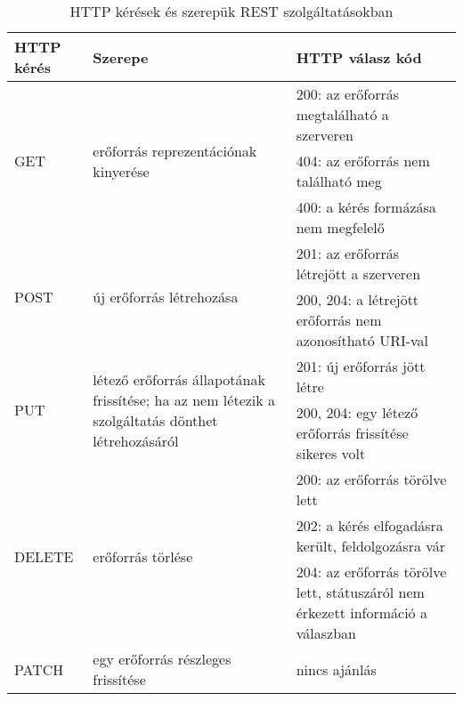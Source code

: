 	\begin{longtable}{| p{.20\linewidth} | p{.50\linewidth} | p{.30\linewidth } |}		
					\caption{HTTP kérések és szerepük REST szolgáltatásokban}
		\label{tab:restAndHttp} \\
		\hline
		HTTP kérés & Szerepe & HTTP válasz kód \\
		\hline
		
		\multirow{3}{*}{GET} & \multirow{3}{*}{erőforrás reprezentációnak kinyerése} & 
		 200: az erőforrás megtalálható a szerveren \\
		 \cline{3-3}
		  & & 404: az erőforrás nem található meg \\
		  		 \cline{3-3}
		  & & 400: a kérés formázása nem megfelelő \\
		\hline
		
		\multirow{2}{*}{POST} & \multirow{2}{*}{új erőforrás létrehozása} & 
		201: az erőforrás létrejött a szerveren\\
		\cline{3-3}
		& & 200, 204: a létrejött erőforrás nem azonosítható URI-val \\
		\hline
		
		\multirow{2}{*}{PUT} & \multirow{2}{*}{\parbox{\linewidth}{létező erőforrás állapotának frissítése; ha az nem létezik a  szolgáltatás dönthet létrehozásáról}} & 
		201: új erőforrás jött létre \\
		\cline{3-3}
		& & 200, 204: egy létező erőforrás frissítése sikeres volt \\
		\hline
		
		\multirow{3}{*}{DELETE} & \multirow{3}{*}{erőforrás törlése} & 
		200: az erőforrás törölve lett \\
		\cline{3-3}
		& & 202: a kérés elfogadásra került, feldolgozásra vár \\
		\cline{3-3}
		& & 204: az erőforrás törölve lett, státuszáról nem érkezett információ a válaszban \\
		\hline
		
		PATCH & egy erőforrás részleges frissítése & nincs ajánlás\\
		\hline
	\end{longtable}